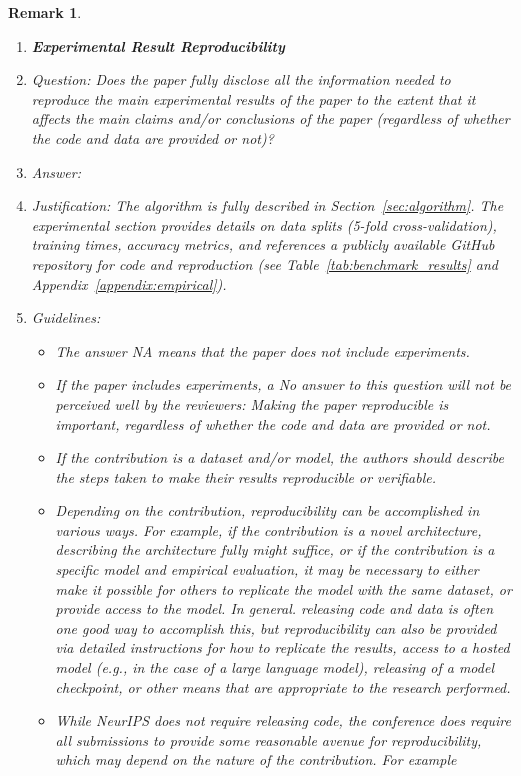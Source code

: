 \documentclass{article}
\newtheorem{remark}{Remark}
\begin{document}
\begin{remark}
\begin{enumerate}
    \item {\bf Experimental Result Reproducibility}
    \item[] Question: Does the paper fully disclose all the information needed to reproduce the main experimental results of the paper to the extent that it affects the main claims and/or conclusions of the paper (regardless of whether the code and data are provided or not)?
    \item[] Answer: \answerYes{}
    \item[] Justification: The algorithm is fully described in Section~\ref{sec:algorithm}. The experimental section provides details on data splits (5-fold cross-validation), training times, accuracy metrics, and references a publicly available GitHub repository for code and reproduction (see Table~\ref{tab:benchmark_results} and Appendix~\ref{appendix:empirical}).
    \item[] Guidelines:
    \begin{itemize}
        \item The answer NA means that the paper does not include experiments.
        \item If the paper includes experiments, a No answer to this question will not be perceived well by the reviewers: Making the paper reproducible is important, regardless of whether the code and data are provided or not.
        \item If the contribution is a dataset and/or model, the authors should describe the steps taken to make their results reproducible or verifiable. 
        \item Depending on the contribution, reproducibility can be accomplished in various ways. For example, if the contribution is a novel architecture, describing the architecture fully might suffice, or if the contribution is a specific model and empirical evaluation, it may be necessary to either make it possible for others to replicate the model with the same dataset, or provide access to the model. In general. releasing code and data is often one good way to accomplish this, but reproducibility can also be provided via detailed instructions for how to replicate the results, access to a hosted model (e.g., in the case of a large language model), releasing of a model checkpoint, or other means that are appropriate to the research performed.
        \item While NeurIPS does not require releasing code, the conference does require all submissions to provide some reasonable avenue for reproducibility, which may depend on the nature of the contribution. For example

\end{itemize}
\end{enumerate}
\end{remark}
\end{document}
